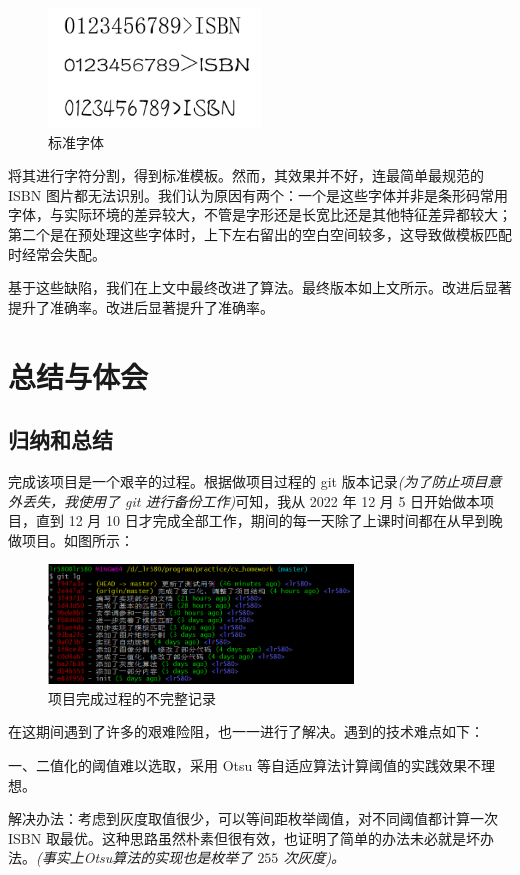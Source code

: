 \documentclass{ctexart}
\begin{document}
\begin{figure}[H]
    \centering
    \includegraphics[height=90pt]{standard_fonts}
    \caption{标准字体}
\end{figure}

将其进行字符分割，得到标准模板。然而，其效果并不好，连最简单最规范的 ISBN 图片都无法识别。我们认为原因有两个：一个是这些字体并非是条形码常用字体，与实际环境的差异较大，不管是字形还是长宽比还是其他特征差异都较大；第二个是在预处理这些字体时，上下左右留出的空白空间较多，这导致做模板匹配时经常会失配。

基于这些缺陷，我们在上文中最终改进了算法。最终版本如上文所示。改进后显著提升了准确率。改进后显著提升了准确率。

\section{总结与体会}
\subsection{归纳和总结}
完成该项目是一个艰辛的过程。根据做项目过程的 git 版本记录\textit{(为了防止项目意外丢失，我使用了 git 进行备份工作)}可知，我从 2022 年 12 月 5 日开始做本项目，直到 12 月 10 日才完成全部工作，期间的每一天除了上课时间都在从早到晚做项目。如图所示：

\begin{figure}[H]
    \centering
    \includegraphics[height=90pt]{working_log}
    \caption{项目完成过程的不完整记录}
\end{figure}

在这期间遇到了许多的艰难险阻，也一一进行了解决。遇到的技术难点如下：

一、二值化的阈值难以选取，采用 Otsu 等自适应算法计算阈值的实践效果不理想。

解决办法：考虑到灰度取值很少，可以等间距枚举阈值，对不同阈值都计算一次 ISBN 取最优。这种思路虽然朴素但很有效，也证明了简单的办法未必就是坏办法。\textit{(事实上Otsu算法的实现也是枚举了 $255$ 次灰度)。}
\end{document}
